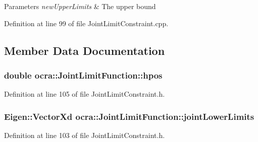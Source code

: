 \begin{DoxyParams}{Parameters}
{\em new\+Upper\+Limits} & The upper bound \\
\hline
\end{DoxyParams}


Definition at line 99 of file Joint\+Limit\+Constraint.\+cpp.



\subsection{Member Data Documentation}
\subsubsection[{\texorpdfstring{hpos}{hpos}}]{\setlength{\rightskip}{0pt plus 5cm}double ocra\+::\+Joint\+Limit\+Function\+::hpos\hspace{0.3cm}{\ttfamily [protected]}}\hypertarget{classocra_1_1JointLimitFunction_affab56a4cc60a886b51c2ef0644d44ba}{}\label{classocra_1_1JointLimitFunction_affab56a4cc60a886b51c2ef0644d44ba}


Definition at line 105 of file Joint\+Limit\+Constraint.\+h.

\subsubsection[{\texorpdfstring{joint\+Lower\+Limits}{jointLowerLimits}}]{\setlength{\rightskip}{0pt plus 5cm}Eigen\+::\+Vector\+Xd ocra\+::\+Joint\+Limit\+Function\+::joint\+Lower\+Limits\hspace{0.3cm}{\ttfamily [protected]}}\hypertarget{classocra_1_1JointLimitFunction_ab0dbcf53e97b8f4b7a56478bd09240f1}{}\label{classocra_1_1JointLimitFunction_ab0dbcf53e97b8f4b7a56478bd09240f1}


Definition at line 103 of file Joint\+Limit\+Constraint.\+h.

